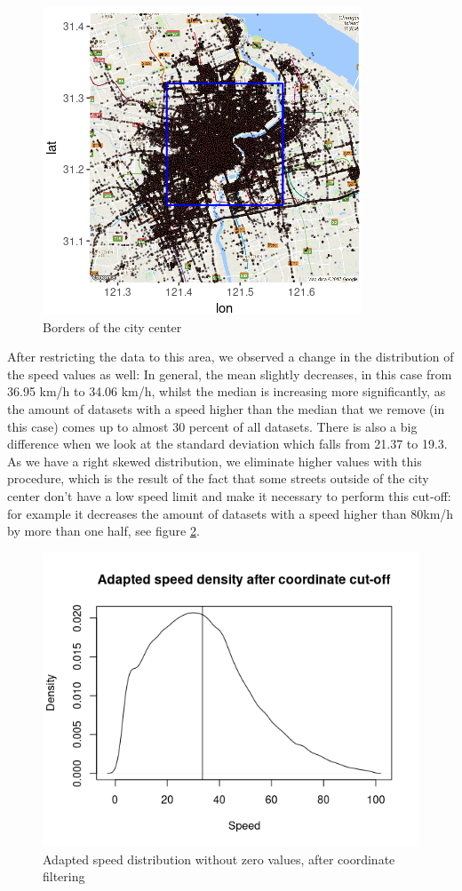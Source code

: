 \documentclass[11pt,conference,a4paper,twocolumns,romanappendices]{IEEEtran}
\begin{document}
\begin{figure}[h]
\centering
\includegraphics[scale=0.9]{borders.png}
\caption{\label{fig:borders}Borders of the city center}
\end{figure}

After restricting the data to this area, we observed a change in the distribution of the speed values as well: In general, the mean slightly decreases, in this case from 36.95 km/h to 34.06 km/h, whilst the median is increasing more significantly, as the amount of datasets with a speed higher than the median that we remove (in this case) comes up to almost 30 percent of all datasets. There is also a big difference when we look at the standard deviation which falls from 21.37 to 19.3. As we have a right skewed distribution, we eliminate higher values with this procedure, which is the result of the fact that some streets outside of the city center don't have a low speed limit and make it necessary to perform this cut-off: for example it decreases the amount of datasets with a speed higher than 80km/h by more than one half, see figure \ref{fig:speed_after}. \\

\begin{figure}[h]
\centering
\includegraphics[scale=0.6]{density_after.png}
\caption{\label{fig:speed_after}Adapted speed distribution without zero values, after coordinate filtering}
\end{figure}
\end{document}
